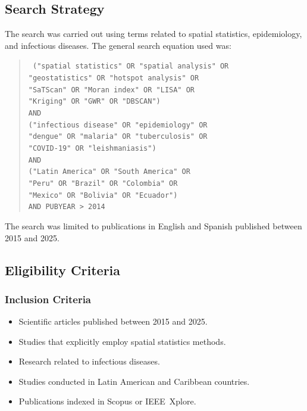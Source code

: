 \documentclass[conference]{IEEEtran}
\begin{document}
\subsection{Search Strategy}

The search was carried out using terms related to spatial
statistics, epidemiology, and infectious diseases. The general
search equation used was:

\begin{quote}
\small
\texttt{
("spatial statistics" OR "spatial analysis" OR\\
"geostatistics" OR "hotspot analysis" OR\\
"SaTScan" OR "Moran index" OR "LISA" OR\\
"Kriging" OR "GWR" OR "DBSCAN")\\
AND\\
("infectious disease" OR "epidemiology" OR\\
"dengue" OR "malaria" OR "tuberculosis" OR\\
"COVID-19" OR "leishmaniasis")\\
AND\\
("Latin America" OR "South America" OR\\
"Peru" OR "Brazil" OR "Colombia" OR\\
"Mexico" OR "Bolivia" OR "Ecuador")\\
AND PUBYEAR > 2014
}
\end{quote}

The search was limited to publications in English and Spanish
published between 2015 and 2025.

\subsection{Eligibility Criteria}

\subsubsection{Inclusion Criteria}
\begin{itemize}
  \item Scientific articles published between 2015 and 2025.
  \item Studies that explicitly employ spatial statistics
    methods.
  \item Research related to infectious diseases.
  \item Studies conducted in Latin American and Caribbean
    countries.
  \item Publications indexed in Scopus or IEEE~Xplore.
\end{itemize}
\end{document}
